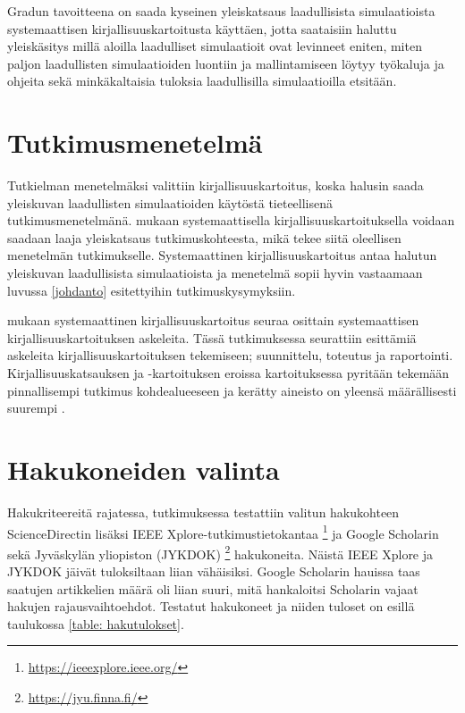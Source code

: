 \documentclass[utf8]{gradu3}
\begin{document}
Gradun tavoitteena on saada kyseinen yleiskatsaus laadullisista simulaatioista systemaattisen kirjallisuuskartoitusta käyttäen, jotta saataisiin haluttu yleiskäsitys millä aloilla laadulliset simulaatioit ovat levinneet eniten, miten paljon laadullisten simulaatioiden luontiin ja mallintamiseen löytyy työkaluja ja ohjeita sekä minkäkaltaisia tuloksia laadullisilla simulaatioilla etsitään.

\section{Tutkimusmenetelmä} \label{tutkimusmenetelmä}
Tutkielman menetelmäksi valittiin kirjallisuuskartoitus, koska halusin saada yleiskuvan laadullisten simulaatioiden käytöstä tieteellisenä tutkimusmenetelmänä. \textcite{keele2007guidelines} mukaan systemaattisella kirjallisuuskartoituksella voidaan saadaan laaja yleiskatsaus tutkimuskohteesta, mikä tekee siitä oleellisen menetelmän tutkimukselle. Systemaattinen kirjallisuuskartoitus antaa halutun yleiskuvan laadullisista simulaatioista ja menetelmä sopii hyvin vastaamaan luvussa \ref{johdanto} esitettyihin tutkimuskysymyksiin.

\textcite{keele2007guidelines} mukaan systemaattinen kirjallisuuskartoitus seuraa
osittain systemaattisen kirjallisuuskartoituksen askeleita.
Tässä tutkimuksessa seurattiin \textcite{keele2007guidelines} esittämiä askeleita kirjallisuuskartoituksen tekemiseen; suunnittelu, toteutus ja raportointi.
Kirjallisuuskatsauksen ja -kartoituksen eroissa kartoituksessa pyritään tekemään 
pinnallisempi tutkimus kohdealueeseen ja kerätty aineisto on 
yleensä määrällisesti suurempi \parencite{keele2007guidelines}.

\section{Hakukoneiden valinta} \label{hakukoneiden valinta}
Hakukriteereitä rajatessa, tutkimuksessa testattiin valitun hakukohteen ScienceDirectin lisäksi IEEE Xplore-tutkimustietokantaa 
\footnote{\url{https://ieeexplore.ieee.org/}} ja Google Scholarin 
sekä Jyväskylän yliopiston (JYKDOK) \footnote{\url{https://jyu.finna.fi/}} hakukoneita. Näistä IEEE Xplore ja JYKDOK jäivät tuloksiltaan liian vähäisiksi.
Google Scholarin hauissa taas saatujen artikkelien määrä oli liian suuri, 
mitä hankaloitsi Scholarin vajaat hakujen rajausvaihtoehdot. 
Testatut hakukoneet ja niiden tuloset on esillä taulukossa \ref{table: hakutulokset}.
\end{document}
